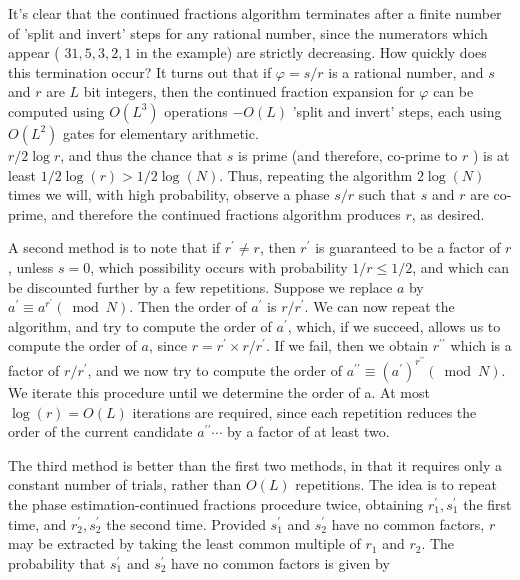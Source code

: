 It's clear that the continued fractions algorithm terminates after a finite number of 'split and invert' steps for any rational number, since the numerators which appear ( $31,5,3,2,1$ in the example) are strictly decreasing. How quickly does this termination occur? It turns out that if $\varphi=s / r$ is a rational number, and $s$ and $r$ are $L$ bit integers, then the continued fraction expansion for $\varphi$ can be computed using $O\left(L^{3}\right)$ operations $-O(L)$ 'split and invert' steps, each using $O\left(L^{2}\right)$ gates for elementary arithmetic.\\
$r / 2 \log r$, and thus the chance that $s$ is prime (and therefore, co-prime to $r$ ) is at least $1 / 2 \log (r)>1 / 2 \log (N)$. Thus, repeating the algorithm $2 \log (N)$ times we will, with high probability, observe a phase $s / r$ such that $s$ and $r$ are co-prime, and therefore the continued fractions algorithm produces $r$, as desired.

A second method is to note that if $r^{\prime} \neq r$, then $r^{\prime}$ is guaranteed to be a factor of $r$, unless $s=0$, which possibility occurs with probability $1 / r \leq 1 / 2$, and which can be discounted further by a few repetitions. Suppose we replace $a$ by $a^{\prime} \equiv a^{r^{\prime}}(\bmod N)$. Then the order of $a^{\prime}$ is $r / r^{\prime}$. We can now repeat the algorithm, and try to compute the order of $a^{\prime}$, which, if we succeed, allows us to compute the order of $a$, since $r=r^{\prime} \times r / r^{\prime}$. If we fail, then we obtain $r^{\prime \prime}$ which is a factor of $r / r^{\prime}$, and we now try to compute the order of $a^{\prime \prime} \equiv\left(a^{\prime}\right)^{r^{\prime \prime}}(\bmod N)$. We iterate this procedure until we determine the order of a. At most $\log (r)=O(L)$ iterations are required, since each repetition reduces the order of the current candidate $a^{\prime \prime} \cdots$ by a factor of at least two.

The third method is better than the first two methods, in that it requires only a constant number of trials, rather than $O(L)$ repetitions. The idea is to repeat the phase estimation-continued fractions procedure twice, obtaining $r_{1}^{\prime}, s_{1}^{\prime}$ the first time, and $r_{2}^{\prime}, s_{2}^{\prime}$ the second time. Provided $s_{1}^{\prime}$ and $s_{2}^{\prime}$ have no common factors, $r$ may be extracted by taking the least common multiple of $r_{1}$ and $r_{2}$. The probability that $s_{1}^{\prime}$ and $s_{2}^{\prime}$ have no common factors is given by

